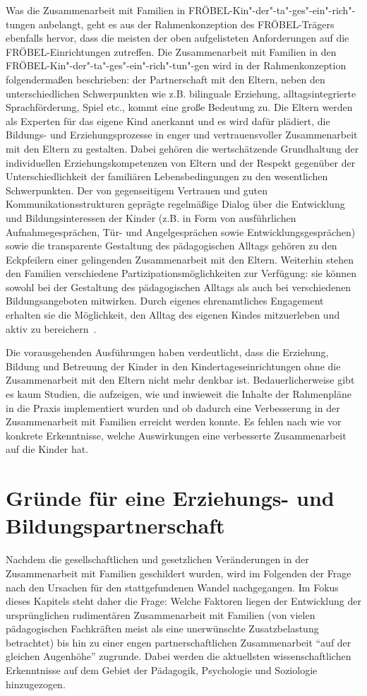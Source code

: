 \documentclass[12pt,a4paper]{article}
\begin{document}
Was die Zusammenarbeit mit Familien in FRÖBEL-Kin"-der"-ta"-ges"-ein"-rich"-tungen anbelangt, geht es aus der Rahmenkonzeption des FRÖBEL-Trägers ebenfalls hervor, dass die meisten der oben aufgelisteten Anforderungen auf die FRÖBEL-Einrichtungen zutreffen. Die Zusammenarbeit mit Familien in den FRÖBEL-Kin"-der"-ta"-ges"-ein"-rich"-tun"-gen wird in der   Rahmenkonzeption folgendermaßen beschrieben: der Partnerschaft mit den Eltern, neben den unterschiedlichen Schwerpunkten wie z.B. bilinguale Erziehung, alltagsintegrierte Sprachförderung, Spiel etc., kommt eine große Bedeutung zu. Die Eltern werden als Experten für das eigene Kind anerkannt und es wird dafür plädiert, die Bildungs- und Erziehungsprozesse in enger und vertrauensvoller Zusammenarbeit mit den Eltern zu gestalten. Dabei gehören die wertschätzende Grundhaltung der individuellen Erziehungskompetenzen von Eltern und der Respekt gegenüber der Unterschiedlichkeit der familiären Lebensbedingungen zu den wesentlichen Schwerpunkten. Der von gegenseitigem Vertrauen und guten Kommunikationsstrukturen geprägte regelmäßige Dialog über die Entwicklung und Bildungsinteressen der Kinder (z.B. in Form von ausführlichen Aufnahmegesprächen, Tür- und Angelgesprächen sowie Entwicklungsgesprächen) sowie die transparente Gestaltung des pädagogischen Alltags gehören zu den Eckpfeilern einer gelingenden Zusammenarbeit mit den Eltern. Weiterhin stehen den Familien verschiedene Partizipationsmöglichkeiten zur Verfügung: sie können sowohl bei der Gestaltung des pädagogischen Alltags als auch bei verschiedenen Bildungsangeboten mitwirken. Durch eigenes ehrenamtliches Engagement erhalten sie die Möglichkeit, den Alltag des eigenen Kindes mitzuerleben und aktiv zu bereichern~\parencite[S.~25-28]{Kieschnick}.

	Die vorausgehenden Ausführungen haben verdeutlicht, dass die Erziehung, Bildung und Betreuung der Kinder in den Kindertageseinrichtungen ohne die Zusammenarbeit mit den Eltern nicht mehr denkbar ist. Bedauerlicherweise gibt es kaum Studien, die aufzeigen, wie und inwieweit die Inhalte der Rahmenpläne in die Praxis implementiert wurden und ob dadurch eine Verbesserung in der Zusammenarbeit mit Familien erreicht werden konnte. Es fehlen nach wie vor konkrete Erkenntnisse, welche Auswirkungen eine verbesserte Zusammenarbeit auf die Kinder hat.

\section{Gründe für eine Erziehungs- und Bildungspartnerschaft}
Nachdem die gesellschaftlichen und gesetzlichen Veränderungen in der Zusammenarbeit mit Familien geschildert wurden, wird im Folgenden der Frage nach den Ursachen für den stattgefundenen Wandel nachgegangen. Im Fokus dieses Kapitels steht daher die Frage: Welche Faktoren liegen der Entwicklung der ursprünglichen rudimentären Zusammenarbeit mit Familien (von vielen pädagogischen Fachkräften meist als eine unerwünschte Zusatzbelastung betrachtet) bis hin zu einer engen partnerschaftlichen Zusammenarbeit "`auf der gleichen Augenhöhe"' zugrunde. Dabei werden die aktuellsten wissenschaftlichen Erkenntnisse auf dem Gebiet der Pädagogik, Psychologie und Soziologie hinzugezogen.
\end{document}
